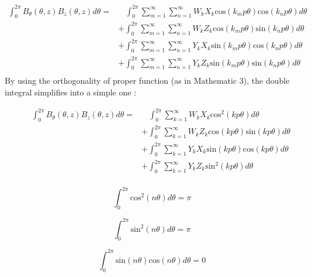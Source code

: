 \begin{equation*}
\begin{split}
\int_0^{2\pi}B_\theta(\theta,z)B_z(\theta,z)d\theta = & ~~~~
    \int_0^{2\pi}\sum_{m=1}^{\infty} \sum_{n=1}^{\infty}W_kX_k\text{cos}(k_mp\theta)\text{cos}(k_np\theta)d\theta\\ & +  \int_0^{2\pi}\sum_{m=1}^{\infty} \sum_{n=1}^{\infty}W_kZ_k\text{cos}(k_mp\theta)\text{sin}(k_np\theta)d\theta\\ & +   \int_0^{2\pi}\sum_{m=1}^{\infty} \sum_{n=1}^{\infty}Y_kX_k\text{sin}(k_mp\theta)\text{cos}(k_np\theta) d\theta\\ &+  \int_0^{2\pi}\sum_{m=1}^{\infty} \sum_{n=1}^{\infty}Y_kZ_k\text{sin}(k_mp\theta)\text{sin}(k_np\theta)d\theta \\
    \end{split}
\end{equation*}
By using the orthogonality of proper function (as in Mathematic 3), the double integral simplifies into a simple one :
\begin{figure}[H]
\begin{minipage}[c]{.6\linewidth}
\begin{equation*}
\begin{split}
\int_0^{2\pi}B_\theta(\theta,z)B_z(\theta,z)d\theta = & ~~~~
    \int_0^{2\pi}\sum_{k=1}^{\infty} W_kX_k\text{cos}^2(kp\theta)d\theta\\ & +  \int_0^{2\pi}\sum_{k=1}^{\infty} W_kZ_k\text{cos}(kp\theta)\text{sin}(kp\theta)d\theta\\ & +   \int_0^{2\pi}\sum_{k=1}^{\infty} Y_kX_k\text{sin}(kp\theta)\text{cos}(kp\theta) d\theta\\ &+  \int_0^{2\pi}\sum_{k=1}^{\infty} Y_kZ_k\text{sin}^2(kp\theta)d\theta \\
    \end{split}
\end{equation*}
\end{minipage}
\hfill
\begin{minipage}[c]{.38\linewidth}

\begin{equation*}
    \int_0^{2\pi} \text{cos}^2(n\theta)d\theta = \pi 
\end{equation*}

\begin{equation*}
    \int_0^{2\pi} \text{sin}^2(n\theta)d\theta = \pi 
\end{equation*}

\begin{equation*}
    \int_0^{2\pi} \text{sin}(n\theta)\text{cos}(n\theta)d\theta = 0
\end{equation*}
\end{minipage}
\end{figure}

